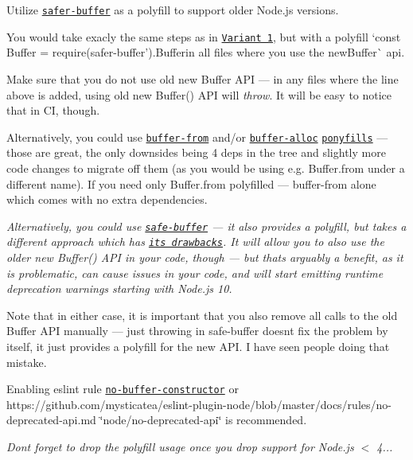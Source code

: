 Utilize \href{https://www.npmjs.com/package/safer-buffer}{\tt safer-\/buffer} as a polyfill to support older Node.\+js versions.

You would take exacly the same steps as in \href{#variant-1}{\tt Variant 1}, but with a polyfill `const Buffer = require(\textquotesingle{}safer-\/buffer').Buffer{\ttfamily in all files where you use the new}Buffer\`{} api.

Make sure that you do not use old {\ttfamily new Buffer} A\+PI — in any files where the line above is added, using old {\ttfamily new Buffer()} A\+PI will {\itshape throw}. It will be easy to notice that in CI, though.

Alternatively, you could use \href{https://www.npmjs.com/package/buffer-from}{\tt buffer-\/from} and/or \href{https://www.npmjs.com/package/buffer-alloc}{\tt buffer-\/alloc} \href{https://ponyfill.com/}{\tt ponyfills} — those are great, the only downsides being 4 deps in the tree and slightly more code changes to migrate off them (as you would be using e.\+g. {\ttfamily Buffer.\+from} under a different name). If you need only {\ttfamily Buffer.\+from} polyfilled — {\ttfamily buffer-\/from} alone which comes with no extra dependencies.

{\itshape Alternatively, you could use \href{https://www.npmjs.com/package/safe-buffer}{\tt safe-\/buffer} — it also provides a polyfill, but takes a different approach which has \href{https://github.com/chalker/safer-buffer#why-not-safe-buffer}{\tt it\textquotesingle{}s drawbacks}. It will allow you to also use the older {\ttfamily new Buffer()} A\+PI in your code, though — but that\textquotesingle{}s arguably a benefit, as it is problematic, can cause issues in your code, and will start emitting runtime deprecation warnings starting with Node.\+js 10.}

Note that in either case, it is important that you also remove all calls to the old Buffer A\+PI manually — just throwing in {\ttfamily safe-\/buffer} doesn\textquotesingle{}t fix the problem by itself, it just provides a polyfill for the new A\+PI. I have seen people doing that mistake.

Enabling eslint rule \href{https://eslint.org/docs/rules/no-buffer-constructor}{\tt no-\/buffer-\/constructor} or https\+://github.com/mysticatea/eslint-\/plugin-\/node/blob/master/docs/rules/no-\/deprecated-\/api.\+md \char`\"{}node/no-\/deprecated-\/api\char`\"{} is recommended.

{\itshape Don\textquotesingle{}t forget to drop the polyfill usage once you drop support for Node.\+js $<$ 4...}

